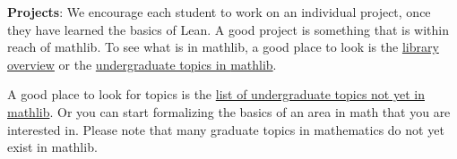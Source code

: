 \documentclass[10pt]{article}
\begin{document}
\textbf{Projects}:
We encourage each student to work on an individual project, once they have learned the basics of Lean. A good project is something that is within reach of \textsf{mathlib}. To see what is in \textsf{mathlib}, a good place to look is the \href{https://leanprover-community.github.io/mathlib-overview.html}{library overview} or the \href{https://leanprover-community.github.io/undergrad.html}{undergraduate topics in \textsf{mathlib}}.

A good place to look for topics is the \href{https://leanprover-community.github.io/undergrad_todo.html}{list of undergraduate topics not yet in \textsf{mathlib}}. Or you can start formalizing the basics of an area in math that you are interested in. Please note that many graduate topics in mathematics do not yet exist in \textsf{mathlib}.
\end{document}

